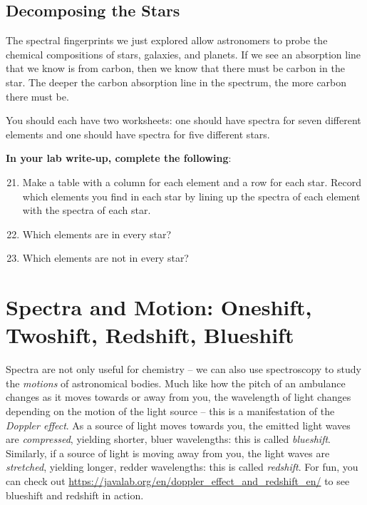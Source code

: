 \documentclass[11pt]{article}
\begin{document}
\bigskip


\subsection{Decomposing the Stars}
The spectral fingerprints we just explored allow astronomers to probe the chemical compositions of stars, galaxies, and planets. If we see an absorption line that we know is from carbon, then we know that there must be carbon in the star. The deeper the carbon absorption line in the spectrum, the more carbon there must be.

\medskip \noindent
You should each have two worksheets: one should have spectra for seven different elements and one should have spectra for five different stars. 

\textbf{In your lab write-up, complete the following}:
\begin{enumerate}
    \setcounter{enumi}{20}
    
    \item Make a table with a column for each element and a row for each star. Record which elements you find in each star by lining up the spectra of each element with the spectra of each star.
    
    \item Which elements are in every star?
    
    \item Which elements are not in every star?
\end{enumerate}

\bigskip

\section{Spectra and Motion: Oneshift, Twoshift, Redshift, Blueshift}

Spectra are not only useful for chemistry -- we can also use spectroscopy to study the \emph{motions} of astronomical bodies. Much like how the pitch of an ambulance changes as it moves towards or away from you, the wavelength of light changes depending on the motion of the light source -- this is a manifestation of the \emph{Doppler effect}. As a source of light moves towards you, the emitted light waves are \emph{compressed}, yielding shorter, bluer wavelengths: this is called \emph{blueshift}. Similarly, if a source of light is moving away from you, the light waves are \emph{stretched}, yielding longer, redder wavelengths: this is called \emph{redshift}. For fun, you can check out \url{https://javalab.org/en/doppler_effect_and_redshift_en/} to see blueshift and redshift in action. 
\end{document}
